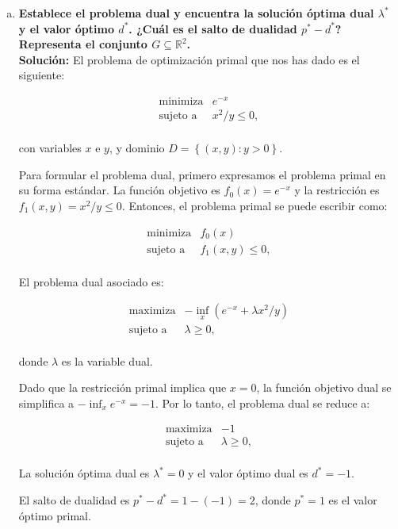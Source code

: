 \begin{enumerate}
\begin{enumerate}[(a)]
	\item \textbf{\boldmath Establece el problema dual y encuentra la solución óptima dual $\lambda^*$ y el valor óptimo $d^*$. ¿Cuál es el salto de dualidad $p^*-d^*$? Representa el conjunto $G\subseteq \mathbb{R}^2$.}\\

	    \textbf{Solución:} El problema de optimización primal que nos has dado es el siguiente:

$$
\begin{array}{ll}
	\text{minimiza} & e^{-x}\\
	\text{sujeto a} & x^2/y\leq 0,\\
\end{array}
$$

con variables $x$ e $y$, y dominio $D=\left\{(x,y):y>0\right\}$.

Para formular el problema dual, primero expresamos el problema primal en su forma estándar. La función objetivo es $f_0(x) = e^{-x}$ y la restricción es $f_1(x,y) = x^2/y \leq 0$. Entonces, el problema primal se puede escribir como:

$$
\begin{array}{ll}
	\text{minimiza} & f_0(x)\\
	\text{sujeto a} & f_1(x,y)\leq 0,\\
\end{array}
$$

El problema dual asociado es:

$$
\begin{array}{ll}
	\text{maximiza} & -\inf_x (e^{-x} + \lambda x^2/y)\\
	\text{sujeto a} & \lambda \geq 0,\\
\end{array}
$$

donde $\lambda$ es la variable dual.

Dado que la restricción primal implica que $x = 0$, la función objetivo dual se simplifica a $-\inf_x e^{-x} = -1$. Por lo tanto, el problema dual se reduce a:

$$
\begin{array}{ll}
	\text{maximiza} & -1\\
	\text{sujeto a} & \lambda \geq 0,\\
\end{array}
$$

La solución óptima dual es $\lambda^* = 0$ y el valor óptimo dual es $d^* = -1$.

El salto de dualidad es $p^* - d^* = 1 - (-1) = 2$, donde $p^* = 1$ es el valor óptimo primal.


\end{enumerate}
\end{enumerate}
